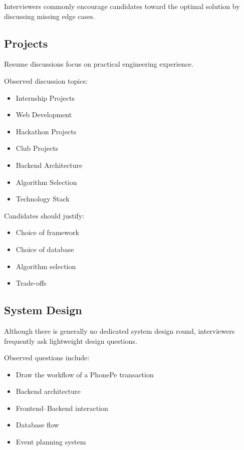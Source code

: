 \documentclass[11pt,a4paper]{article}
\begin{document}
Interviewers commonly encourage candidates toward the optimal solution by discussing missing edge cases.


\subsection{Projects}

Resume discussions focus on practical engineering experience.

Observed discussion topics:

\begin{itemize}
	\item Internship Projects
	\item Web Development
	\item Hackathon Projects
	\item Club Projects
	\item Backend Architecture
	\item Algorithm Selection
	\item Technology Stack
\end{itemize}

Candidates should justify:

\begin{itemize}
	\item Choice of framework
	\item Choice of database
	\item Algorithm selection
	\item Trade-offs
\end{itemize}


\subsection{System Design}

Although there is generally no dedicated system design round, interviewers frequently ask lightweight design questions.

Observed questions include:

\begin{itemize}
	\item Draw the workflow of a PhonePe transaction
	\item Backend architecture
	\item Frontend--Backend interaction
	\item Database flow
	\item Event planning system
\end{itemize}
\end{document}
